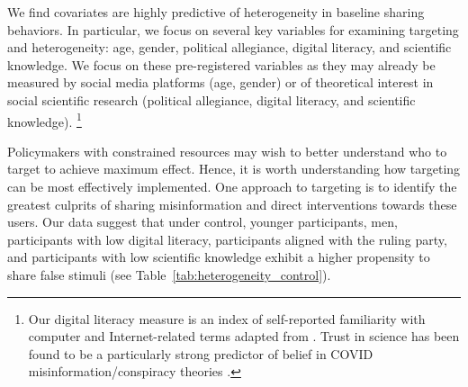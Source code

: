 \documentclass[letterpaper, 12pt, parskip=full,DIV=10]{scrartcl}
\begin{document}
We find covariates are highly predictive of heterogeneity in baseline sharing behaviors. In particular, we focus on several key variables for examining targeting and heterogeneity: age, gender, political allegiance, digital literacy, and scientific knowledge. We focus on these pre-registered variables as they may already be measured by social media platforms (age, gender) or of theoretical interest in social scientific research (political allegiance, digital literacy, and scientific knowledge).%
\footnote{%
Our digital literacy measure is an index of self-reported familiarity with computer and Internet-related terms adapted from \citet{guessmunger2020}.
Trust in science has been found to be a particularly strong predictor of belief in COVID misinformation/conspiracy theories \citep{murphy2021psychological}.
}

Policymakers with constrained resources may wish to better understand who to target to achieve maximum effect. Hence, it is worth understanding how targeting can be most effectively implemented. One approach to targeting is to identify the greatest culprits of sharing misinformation and direct interventions towards these users. Our data suggest that under control, younger participants, men, participants with low digital literacy, participants aligned with the ruling party, and participants with low scientific knowledge exhibit a higher propensity to share false stimuli (see Table~\ref{tab:heterogeneity_control}).
\end{document}
